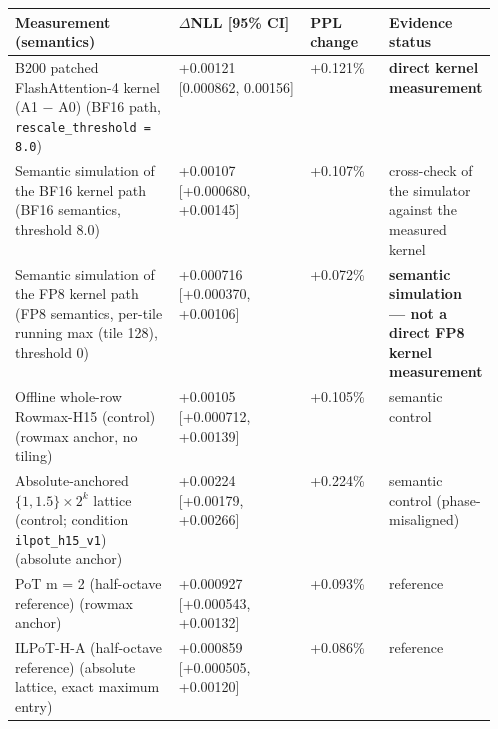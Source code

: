 \begingroup
{}%
\label{tab:appx-h15-full}%
\par\medskip{}\par\smallskip
{}
{\scriptsize
\setlength{\tabcolsep}{3pt}
\begin{longtable}{@{}>{\raggedright\arraybackslash}p{0.34\linewidth}ll>{\raggedright\arraybackslash}p{0.22\linewidth}@{}}
\toprule
\textbf{Measurement (semantics)} & \textbf{$\Delta$NLL [95\% CI]} & \textbf{PPL change} & \textbf{Evidence status} \\
\midrule
\endhead
B200 patched FlashAttention-4 kernel (A1 $-$ A0) (BF16 path, \texttt{rescale\_threshold = 8.0}) & +0.00121 [0.000862, 0.00156] & +0.121\% & \textbf{direct kernel measurement} \\
Semantic simulation of the BF16 kernel path (BF16 semantics, threshold 8.0) & +0.00107 [+0.000680, +0.00145] & +0.107\% & cross-check of the simulator against the measured kernel \\
Semantic simulation of the FP8 kernel path (FP8 semantics, per-tile running max (tile 128), threshold 0) & +0.000716 [+0.000370, +0.00106] & +0.072\% & \textbf{semantic simulation --- not a direct FP8 kernel measurement} \\
Offline whole-row Rowmax-H15 (control) (rowmax anchor, no tiling) & +0.00105 [+0.000712, +0.00139] & +0.105\% & semantic control \\
Absolute-anchored \(\{1,1.5\}\times2^k\) lattice (control; condition \texttt{ilpot\_h15\_v1}) (absolute anchor) & +0.00224 [+0.00179, +0.00266] & +0.224\% & semantic control (phase-misaligned) \\
PoT m = 2 (half-octave reference) (rowmax anchor) & +0.000927 [+0.000543, +0.00132] & +0.093\% & reference \\
ILPoT-H-A (half-octave reference) (absolute lattice, exact maximum entry) & +0.000859 [+0.000505, +0.00120] & +0.086\% & reference \\
\bottomrule
\end{longtable}
\addtocounter{table}{-1}
}
\par{}\par
